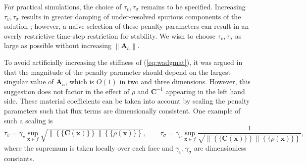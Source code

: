 \documentclass{siamart0216}
\newcommand{\nor}[1]{\left\| #1 \right\|}
\newcommand{\LRc}[1]{\left\{ #1 \right\}}
\newcommand{\avg}[1] {\ensuremath{\LRc{\!\{#1\}\!}}}
\begin{document}
For practical simulations, the choice of $\tau_v, \tau_\sigma$ remains to be specified.  Increasing $\tau_v,\tau_\sigma$ results in greater damping of under-resolved spurious components of the solution \cite{chan2016short}; however, a naive selection of these penalty parameters can result in an overly restrictive time-step restriction for stability.  We wish to choose $\tau_v,\tau_\sigma$ as large as possible without increasing $\nor{\bm{A}_h}$.  

To avoid artificially increasing the stiffness of (\ref{eq:wadgmat}), it was argued in \cite{chan2016short} that the magnitude of the penalty parameter should depend on the largest singular value of $\bm{A}_n$, which is $O(1)$ in two and three dimensions.  However, this suggestion does not factor in the effect of $\rho$ and $\bm{C}^{-1}$ appearing in the left hand side.  These material coefficients can be taken into account by scaling the penalty parameters such that flux terms are dimensionally consistent.  One example of such a scaling is
\[
\tau_v = \gamma_v \sup_{\bm{x} \in f} \sqrt{\nor{\avg{\bm{C}(\bm{x})}}\avg{\rho(\bm{x})}}, \qquad \tau_\sigma =  \gamma_\sigma  \sup_{\bm{x} \in f} \frac{1}{\sqrt{\nor{\avg{\bm{C}(\bm{x})}}\avg{\rho(\bm{x})}}},
\]  
where the supremum is taken locally over each face and $\gamma_v, \gamma_\sigma$ are dimensionless constants.  %

% 




\end{document}
